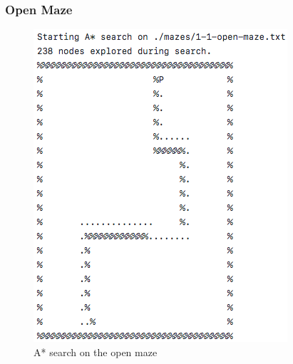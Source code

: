 \documentclass[titlepage]{article}
\begin{document}
\subsubsection{Open Maze}
\begin{figure}[h!]
\includegraphics[width=\linewidth]{astaropen.png}
\caption{A* search on the open maze}
\label{fig:ASTARopen}
\end{figure}

\newpage
\end{document}
